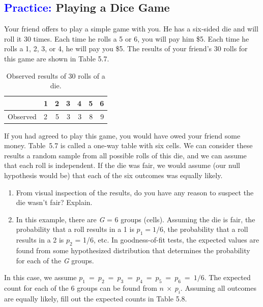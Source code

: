 \documentclass[
]{report}
\begin{document}
\hypertarget{playing-a-dice-game}{%
\subsection*{\texorpdfstring{\textcolor{blue}{Practice:} Playing a Dice Game}{ Playing a Dice Game}}\label{playing-a-dice-game}}

Your friend offers to play a simple game with you. He has a six‑sided die and will roll it 30 times. Each time he rolls a 5 or 6, you will pay him \$5. Each time he rolls a 1, 2, 3, or 4, he will pay you \$5. The results of your friend's 30 rolls for this game are shown in Table 5.7.

\begin{table}[!h]
\centering
\caption{\label{tab:tab57}Observed results of 30 rolls of a die.}
\centering
\begin{tabular}[t]{llrrrrr}
\toprule
  & 1 & 2 & 3 & 4 & 5 & 6\\
\midrule
Observed & 2 & 5 & 3 & 3 & 8 & 9\\
\bottomrule
\end{tabular}
\end{table}

If you had agreed to play this game, you would have owed your friend some money. Table~5.7 is called a one-way table with six cells. We can consider these results a random sample from all possible rolls of this die, and we can assume that each roll is independent. If the die was fair, we would assume (our null hypothesis would be) that each of the six outcomes was equally likely.

\begin{enumerate}
\def\labelenumi{\arabic{enumi}.}
\setcounter{enumi}{31}
\item
  From visual inspection of the results, do you have any reason to suspect the die wasn't fair? Explain.
\item
  In this example, there are \emph{G} = 6 groups (cells). Assuming the die is fair, the probability that a roll results in a 1 is \(p_1 = 1/6\), the probability that a roll results in a 2 is \(\scriptstyle p_2\) = 1/6, etc. In goodness-of-fit tests, the expected values are found from some hypothesized distribution that determines the probability for each of the \emph{G} groups.
\end{enumerate}

In this case, we assume \(\scriptstyle p_1 \ =\  p_2 \ =\  p_3 \ =\  p_4 \ =\  p_5 \ =\  p_6 \ =\  1/6\). The expected count for each of the 6 groups can be found from \(\scriptstyle n \ \times \ p_i\). Assuming all outcomes are equally likely, fill out the expected counts in Table 5.8.
\end{document}
